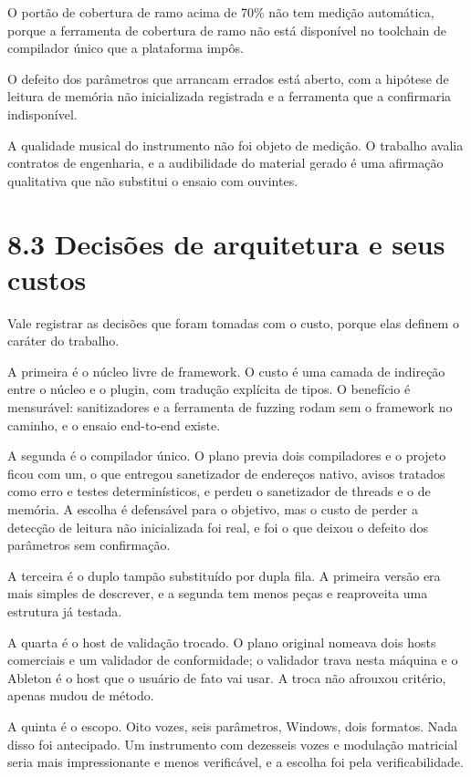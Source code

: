 \documentclass[12pt,a4paper]{article}
\begin{document}
O portão de cobertura de ramo acima de 70\% não tem medição automática, porque a ferramenta de cobertura de ramo não está disponível no toolchain de compilador único que a plataforma impôs.


O defeito dos parâmetros que arrancam errados está aberto, com a hipótese de leitura de memória não inicializada registrada e a ferramenta que a confirmaria indisponível.


A qualidade musical do instrumento não foi objeto de medição. O trabalho avalia contratos de engenharia, e a audibilidade do material gerado é uma afirmação qualitativa que não substitui o ensaio com ouvintes.


\section*{8.3 Decisões de arquitetura e seus custos}

Vale registrar as decisões que foram tomadas com o custo, porque elas definem o caráter do trabalho.


A primeira é o núcleo livre de framework. O custo é uma camada de indireção entre o núcleo e o plugin, com tradução explícita de tipos. O benefício é mensurável: sanitizadores e a ferramenta de fuzzing rodam sem o framework no caminho, e o ensaio end-to-end existe.


A segunda é o compilador único. O plano previa dois compiladores e o projeto ficou com um, o que entregou sanetizador de endereços nativo, avisos tratados como erro e testes determinísticos, e perdeu o sanetizador de threads e o de memória. A escolha é defensável para o objetivo, mas o custo de perder a detecção de leitura não inicializada foi real, e foi o que deixou o defeito dos parâmetros sem confirmação.


A terceira é o duplo tampão substituído por dupla fila. A primeira versão era mais simples de descrever, e a segunda tem menos peças e reaproveita uma estrutura já testada.


A quarta é o host de validação trocado. O plano original nomeava dois hosts comerciais e um validador de conformidade; o validador trava nesta máquina e o Ableton é o host que o usuário de fato vai usar. A troca não afrouxou critério, apenas mudou de método.


A quinta é o escopo. Oito vozes, seis parâmetros, Windows, dois formatos. Nada disso foi antecipado. Um instrumento com dezesseis vozes e modulação matricial seria mais impressionante e menos verificável, e a escolha foi pela verificabilidade.
\end{document}
